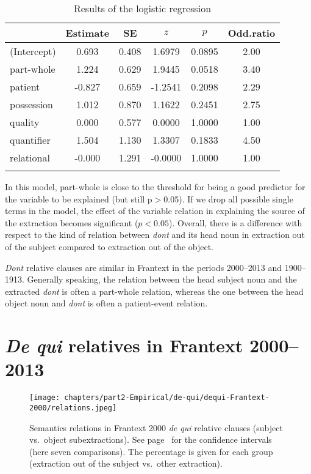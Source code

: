 \begin{table}
\begin{tabular}{l S[table-format=-1.3] S[table-format=1.3] S[table-format=-1.4] S[table-format=1.4] S[table-format=1.2]}
  \lsptoprule
         & {Estimate} & {SE} & {$z$} & {$p$} & {Odd.ratio} \\ 
  \midrule
(Intercept) & 0.693 & 0.408 & 1.6979 & 0.0895 & 2.00 \\ 
   part-whole & 1.224 & 0.629 & 1.9445 & 0.0518 & 3.40 \\ 
   patient & -0.827 & 0.659 & -1.2541 & 0.2098 & 2.29 \\ 
   possession & 1.012 & 0.870 & 1.1622 & 0.2451 & 2.75 \\ 
   quality & 0.000 & 0.577 & 0.0000 & 1.0000 & 1.00 \\ 
   quantifier & 1.504 & 1.130 & 1.3307 & 0.1833 & 4.50 \\ 
   relational & -0.000 & 1.291 & -0.0000 & 1.0000 & 1.00 \\ 
   \lspbottomrule
\end{tabular}
\caption{Results of the logistic regression}
        \label{tab:d1900-relations}
\end{table}

In this model, part-whole is close to the threshold for being a good predictor for the variable to be explained (but still p$>$0.05). If we drop all possible single terms in the model, the effect of the variable relation in explaining the source of the extraction becomes significant ($p<0.05$). Overall, there is a difference with respect to the kind of relation between \emph{dont} and its head noun in extraction out of the subject compared to extraction out of the object.

\emph{Dont} relative clauses are similar in Frantext in the periods 2000--2013 and 1900--1913. Generally speaking, the relation between the head subject noun and the extracted \emph{dont} is often a part-whole relation, whereas the one between the head object noun and \emph{dont} is often a patient-event relation.

\section{\emph{De qui} relatives in Frantext 2000--2013}

\begin{figure}
        \centering
        \texttt{[image: chapters/part2-Empirical/de-qui/dequi-Frantext-2000/relations.jpeg]}
        \caption[Semantic relations in Frantext 2000 \emph{de qui} relative clauses (subject vs.\ object subextractions)]{Semantics relations in Frantext 2000 \emph{de qui} relative clauses (subject vs.\ object subextractions). See page~\pageref{ch:conf-intervals-binomial} for the confidence intervals (here seven comparisons). The percentage is given for each group (extraction out of the subject vs.\ other extraction).}
        \label{fig:dq2000-relations}
\end{figure}

